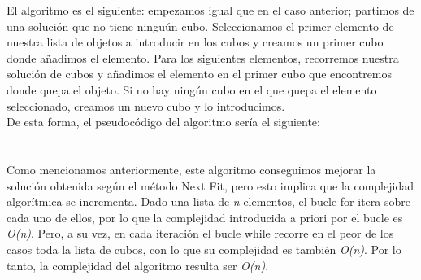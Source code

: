 \documentclass[a4paper, 12pt, oneside]{book}
\begin{document}
	El algoritmo es el siguiente: empezamos igual que en el caso anterior; partimos de una soluci\'on que no tiene ningu\'un cubo. Seleccionamos el primer elemento de nuestra lista de objetos a introducir en los cubos y creamos un primer cubo donde a\~{n}adimos el elemento. Para los siguientes elementos, recorremos nuestra soluci\'on de cubos y a\~{n}adimos el elemento en el primer cubo que encontremos donde quepa el objeto. Si no hay ning\'un cubo en el que quepa el elemento seleccionado, creamos un nuevo cubo y lo introducimos.
	\\
	
	De esta forma, el pseudoc\'odigo del algoritmo ser\'ia el siguiente:
	\\
	
	\noindent{}
	\\\\
	
	Como mencionamos anteriormente, este algoritmo conseguimos mejorar la soluci\'on obtenida seg\'un el m\'etodo Next Fit, pero esto implica que la complejidad algor\'itmica se incrementa. Dado una lista de \textit{n} elementos, el bucle for itera sobre cada uno de ellos, por lo que la complejidad introducida a priori por el bucle es \textit{O(n)}. Pero, a su vez, en cada iteraci\'on el bucle while recorre en el peor de los casos toda la lista de cubos, con lo que su complejidad es tambi\'en \textit{O(n)}. Por lo tanto, la complejidad del algoritmo resulta ser \textit{O(n)}.
	\\
	
\end{document}
